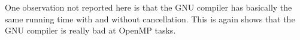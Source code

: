 One observation not reported here
is that the GNU compiler has basically the same running time with and without cancellation.
This is again shows that the GNU compiler is really bad at OpenMP tasks.




